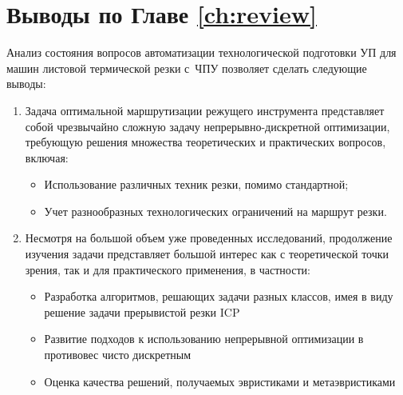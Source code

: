 
\section{Выводы по Главе \ref{ch:review}}
\label{sec:review.conclude}

Анализ состояния вопросов автоматизации технологической подготовки УП
для машин листовой термической резки с~ЧПУ
позволяет сделать следующие выводы:

\begin{enumerate}
  \item
  Задача оптимальной маршрутизации режущего инструмента
  представляет собой чрезвычайно сложную задачу непрерывно-дискретной оптимизации,
  требующую решения множества теоретических и практических вопросов,
  включая:
  \begin{itemize}
    \item Использование различных техник резки, помимо стандартной;
    \item Учет разнообразных технологических ограничений на маршрут резки.
  \end{itemize}
  \item Несмотря на большой объем уже проведенных исследований,
  продолжение изучения задачи представляет большой интерес
  как с теоретической точки зрения,
  так и для практического применения,
  в частности:
  \begin{itemize}
    \item Разработка алгоритмов, решающих задачи разных классов,
    имея в виду решение задачи прерывистой резки ICP
    \item Развитие подходов к использованию непрерывной оптимизации
    в противовес чисто дискретным
    \item Оценка качества решений,
    получаемых эвристиками и метаэвристиками
  \end{itemize}
\end{enumerate}
